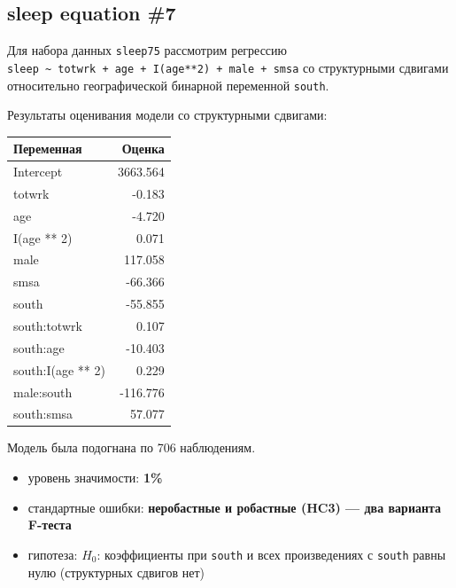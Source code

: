 \documentclass[
  russian,
]{article}
\newcounter{none} %
\providecommand{\tightlist}{%
  \setlength{\itemsep}{0pt}\setlength{\parskip}{0pt}}
\begin{document}
\subsection{sleep equation \#7}\label{sleep-equation-7}

Для набора данных \texttt{sleep75} рассмотрим регрессию
\texttt{sleep\ \textasciitilde{}\ totwrk\ +\ age\ +\ I(age**2)\ +\ male\ +\ smsa}
со структурными сдвигами относительно географической бинарной переменной
\texttt{south}.

Результаты оценивания модели со структурными сдвигами:

{\def\LTcaptype{none} %
\begin{longtable}[]{@{}lr@{}}
\toprule\noalign{}
Переменная & Оценка \\
\midrule\noalign{}
\endhead
\bottomrule\noalign{}
\endlastfoot
Intercept & 3663.564 \\
totwrk & -0.183 \\
age & -4.720 \\
I(age ** 2) & 0.071 \\
male & 117.058 \\
smsa & -66.366 \\
south & -55.855 \\
south:totwrk & 0.107 \\
south:age & -10.403 \\
south:I(age ** 2) & 0.229 \\
male:south & -116.776 \\
south:smsa & 57.077 \\
\end{longtable}
}

Модель была подогнана по 706 наблюдениям.

\begin{tcolorbox}[enhanced jigsaw, arc=.35mm, bottomrule=.15mm, bottomtitle=1mm, breakable, colback=white, colbacktitle=quarto-callout-important-color!10!white, colframe=quarto-callout-important-color-frame, coltitle=black, left=2mm, leftrule=.75mm, opacityback=0, opacitybacktitle=0.6, rightrule=.15mm, title=\textcolor{quarto-callout-important-color}{\faExclamation}\hspace{0.5em}{Условия теста}, titlerule=0mm, toprule=.15mm, toptitle=1mm]

\begin{itemize}
\tightlist
\item
  уровень значимости: \textbf{1\%}
\item
  стандартные ошибки: \textbf{неробастные и робастные (HC3) --- два
  варианта F-теста}
\item
  гипотеза: \(H_0\): коэффициенты при \texttt{south} и всех
  произведениях с \texttt{south} равны нулю (структурных сдвигов нет)
\end{itemize}

\end{tcolorbox}
\end{document}
